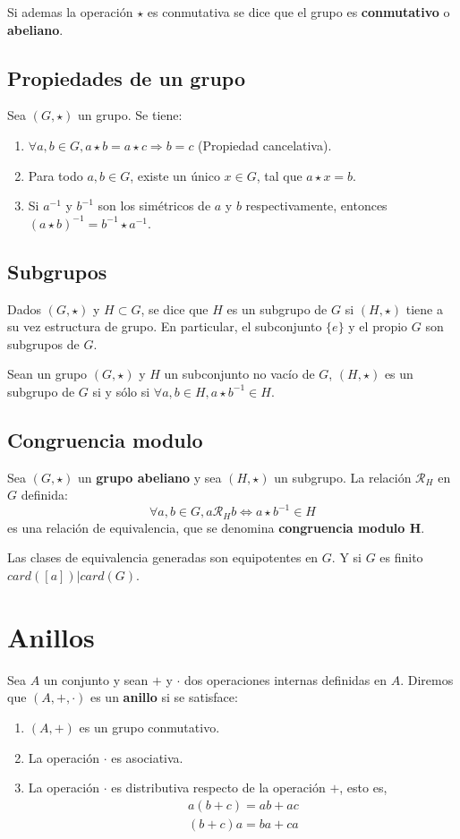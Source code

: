 Si ademas la operación $\star$ es conmutativa se dice que el grupo es \textbf{conmutativo} o \textbf{abeliano}.

\subsection{Propiedades de un grupo}

Sea $(G,\star)$ un grupo. Se tiene:
\begin{enumerate}
\item $\forall a,b \in G, a \star b = a \star c \Rightarrow b = c$ (Propiedad cancelativa).
\item Para todo $a,b \in G$, existe un único $x \in G$, tal que $a \star x = b$.
\item Si $a^{-1}$ y $b^{-1}$ son los simétricos de $a$ y $b$ respectivamente, entonces ${(a \star b)}^{-1} = b^{-1} \star a^{-1}$.
\end{enumerate}

\subsection{Subgrupos}

Dados $(G,\star)$ y $H \subset G$, se dice que $H$ es un subgrupo de $G$ si $(H,\star)$ tiene a su vez estructura de grupo. En particular, el subconjunto $\{e\}$ y el propio $G$ son subgrupos de $G$.

Sean un grupo $(G,\star)$ y $H$ un subconjunto no vacío de $G$, $(H,\star)$ es un subgrupo de $G$ si y sólo si $\forall a,b \in H, a \star b^{-1} \in H$.

\subsection{Congruencia modulo}

Sea $(G,\star)$ un \textbf{grupo abeliano} y sea $(H,\star)$ un subgrupo. La relación $\mathcal{R}_H$ en $G$ definida:
\[
\forall a,b \in G, a \mathcal{R}_H b \Leftrightarrow a \star b^{-1} \in H
\]
es una relación de equivalencia, que se denomina \textbf{congruencia modulo H}.

Las clases de equivalencia generadas son equipotentes en $G$. Y si $G$ es finito $card([a])|card(G)$.

\section{Anillos}

Sea $A$ un conjunto y sean $+$ y $\cdot$ dos operaciones internas definidas en $A$. Diremos que $(A,+,\cdot)$ es un \textbf{anillo} si se satisface:
\begin{enumerate}
\item $(A,+)$ es un grupo conmutativo.
\item La operación $\cdot$ es asociativa.
\item La operación $\cdot$ es distributiva respecto de la operación $+$, esto es,
\begin{align*}
a(b+c)=ab+ac \\ (b+c)a=ba+ca
\end{align*}
\end{enumerate}

